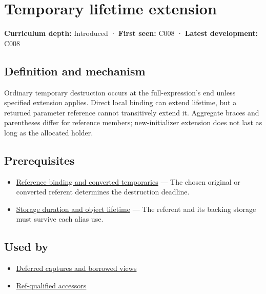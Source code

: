 \hypertarget{appendix-a978b29bbbb0}{}\label{referencestart:appendix-a978b29bbbb0}
\section{Temporary lifetime extension}\label{appendix-a978b29bbbb0-temporary-lifetime-extension}

\textbf{Curriculum depth:} Introduced · \textbf{First seen:} C008 · \textbf{Latest development:} C008

\begin{allmightroledefinition}

\subsection{Definition and mechanism}\label{appendix-a978b29bbbb0-definition-and-mechanism}

Ordinary temporary destruction occurs at the full-expression's end unless specified extension applies. Direct local binding can extend lifetime, but a returned parameter reference cannot transitively extend it. Aggregate braces and parentheses differ for reference members; new-initializer extension does not last as long as the allocated holder.

\end{allmightroledefinition}

\subsection{Prerequisites}\label{appendix-a978b29bbbb0-prerequisites}

\begin{itemize}
\tightlist
\item
  \hyperref[appendix-37856d997bb0]{Reference binding and converted temporaries} --- The chosen original or converted referent determines the destruction deadline.
\item
  \hyperref[appendix-0b104bcba06b]{Storage duration and object lifetime} --- The referent and its backing storage must survive each alias use.
\end{itemize}

\subsection{Used by}\label{appendix-a978b29bbbb0-used-by}

\begin{itemize}
\tightlist
\item
  \hyperref[appendix-aea529eb5175]{Deferred captures and borrowed views}
\item
  \hyperref[appendix-d42039b1d6f7]{Ref-qualified accessors}
\end{itemize}

